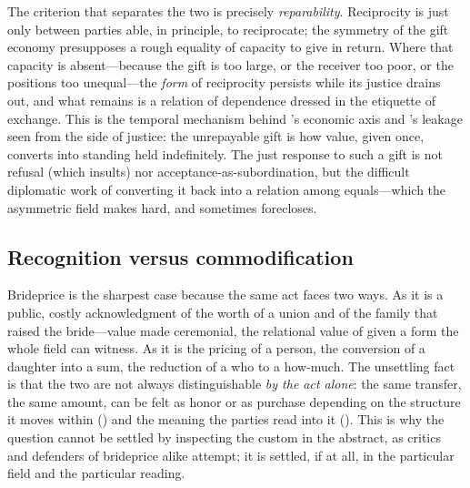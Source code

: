 The criterion that separates the two is precisely \emph{reparability}. Reciprocity is just only between parties able, in principle, to reciprocate; the symmetry of the gift economy presupposes a rough equality of capacity to give in return. Where that capacity is absent---because the gift is too large, or the receiver too poor, or the positions too unequal---the \emph{form} of reciprocity persists while its justice drains out, and what remains is a relation of dependence dressed in the etiquette of exchange. This is the temporal mechanism behind 's economic axis and 's leakage seen from the side of justice: the unrepayable gift is how value, given once, converts into standing held indefinitely. The just response to such a gift is not refusal (which insults) nor acceptance-as-subordination, but the difficult diplomatic work of converting it back into a relation among equals---which the asymmetric field makes hard, and sometimes forecloses.

\subsection{Recognition versus commodification}
Brideprice is the sharpest case because the same act faces two ways. As  it is a public, costly acknowledgment of the worth of a union and of the family that raised the bride---value made ceremonial, the relational value of  given a form the whole field can witness. As  it is the pricing of a person, the conversion of a daughter into a sum, the reduction of a who to a how-much. The unsettling fact is that the two are not always distinguishable \emph{by the act alone}: the same transfer, the same amount, can be felt as honor or as purchase depending on the structure it moves within () and the meaning the parties read into it (). This is why the question cannot be settled by inspecting the custom in the abstract, as critics and defenders of brideprice alike attempt; it is settled, if at all, in the particular field and the particular reading.

